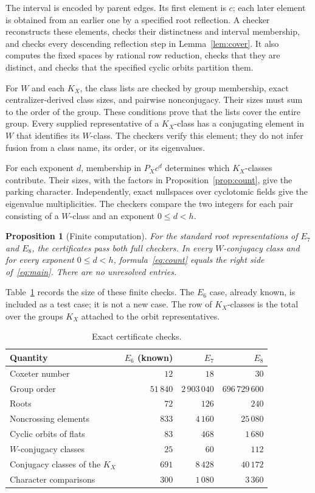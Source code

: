 \documentclass[11pt]{article}
\newtheorem{proposition}[theorem]{Proposition}
\begin{document}
The interval is encoded by parent edges. Its first element is $c$;
each later element is obtained from an earlier one by a specified root
reflection. A checker reconstructs these elements, checks their
distinctness and interval membership, and checks every descending
reflection step in Lemma~\ref{lem:cover}. It also computes the fixed
spaces by rational row reduction, checks that they are distinct, and
checks that the specified cyclic orbits partition them.

For $W$ and each $K_X$, the class lists are checked by group
membership, exact centralizer-derived class sizes, and pairwise
nonconjugacy. Their sizes must sum to the order of the group. These
conditions prove that the lists cover the entire group. Every supplied
representative of a $K_X$-class has a conjugating element in $W$ that
identifies its $W$-class. The checkers verify this element; they do not
infer fusion from a class name, its order, or its eigenvalues.

For each exponent $d$, membership in $P_Xc^d$ determines which
$K_X$-classes contribute. Their sizes, with the factors in
Proposition~\ref{prop:count}, give the parking character. Independently,
exact nullspaces over cyclotomic fields give the eigenvalue
multiplicities. The checkers compare the two integers for each pair
consisting of a $W$-class and an exponent $0\leq d<h$.

\begin{proposition}[Finite computation]\label{prop:finite}
For the standard root representations of $E_7$ and $E_8$, the
certificates pass both full checkers. In every $W$-conjugacy class and
for every exponent $0\leq d<h$, formula~\eqref{eq:count} equals the
right side of~\eqref{eq:main}. There are no unresolved entries.
\end{proposition}

Table~\ref{tab:computation} records the size of these finite checks.
The $E_6$ case, already known, is included as a test case; it is not a
new case. The row of $K_X$-classes is the total over the groups $K_X$
attached to the orbit representatives.

\begin{table}[ht]
\centering
\caption{Exact certificate checks.}
\label{tab:computation}
\begin{tabular}{lrrr}
\toprule
Quantity & $E_6$ (known) & $E_7$ & $E_8$\\
\midrule
Coxeter number & $12$ & $18$ & $30$\\
Group order & $51\,840$ & $2\,903\,040$ & $696\,729\,600$\\
Roots & $72$ & $126$ & $240$\\
Noncrossing elements & $833$ & $4\,160$ & $25\,080$\\
Cyclic orbits of flats & $83$ & $468$ & $1\,680$\\
$W$-conjugacy classes & $25$ & $60$ & $112$\\
Conjugacy classes of the $K_X$ & $691$ & $8\,428$ & $40\,172$\\
Character comparisons & $300$ & $1\,080$ & $3\,360$\\
\bottomrule
\end{tabular}
\end{table}
\end{document}
